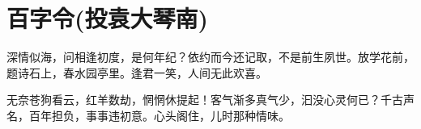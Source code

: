 \section{百字令(投袁大琴南)}


深情似海，问相逢初度，是何年纪？依约而今还记取，不是前生夙世。放学花前，题诗石上，春水园亭里。逢君一笑，人间无此欢喜。


无奈苍狗看云，红羊数劫，惘惘休提起！客气渐多真气少，汩没心灵何已？千古声名，百年担负，事事违初意。心头阁住，儿时那种情味。

